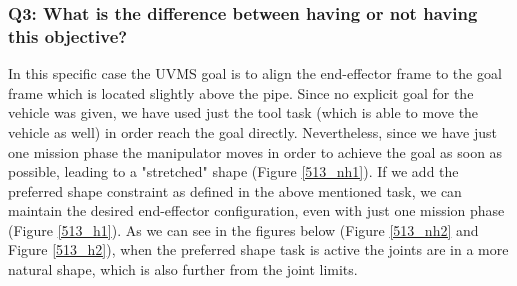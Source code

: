 \documentclass{article}
\begin{document}
\subsubsection{Q3: What is the difference between having or not having this objective?} %
In this specific case the UVMS goal is to align the end-effector frame to the goal frame which is located slightly above the pipe. Since no explicit goal for the vehicle was given, we have used just the tool task (which is able to move the vehicle as well) in order reach the goal directly. Nevertheless, since we have just one mission phase the manipulator moves in order to achieve the goal as soon as possible, leading to a "stretched" shape (Figure \ref{513_nh1}). If we add the preferred shape constraint as defined in the above mentioned task, we can maintain the desired end-effector configuration, even with just one mission phase (Figure \ref{513_h1}). As we can see in the figures below (Figure \ref{513_nh2} and Figure \ref{513_h2}), when the preferred shape task is active the joints are in a more natural shape, which is also further from the joint limits.
\end{document}
